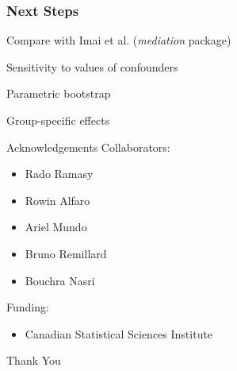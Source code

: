 \documentclass[14pt]{beamer}
\begin{document}
\begin{frame}
    \frametitle{Next Steps}
    \begin{outline}
        \1 Compare with Imai et al. (\textit{mediation} package)

        \1 Sensitivity to values of confounders

        \1 Parametric bootstrap
        
        \1 Group-specific effects 
    \end{outline}
\end{frame}

\begin{frame}{Acknowledgements}
    Collaborators:
    \begin{itemize}
        \item Rado Ramasy
        \item Rowin Alfaro
        \item Ariel Mundo
        \item Bruno Remillard
        \item Bouchra Nasri \newline
    \end{itemize}

    Funding:
    \begin{itemize}
        \item Canadian Statistical Sciences Institute
    \end{itemize}
\end{frame}

\begin{frame}
    \centering
    \Huge Thank You
\end{frame}
\end{document}
